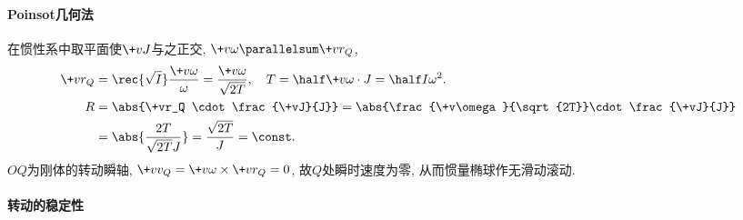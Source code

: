 \documentclass[../LectureNotes.tex]{subfiles}
\begin{document}
\paragraph{Poinsot几何法} %
\label{par:poinsot几何法}

在惯性系中取平面使$\+vJ$与之正交, $\+v\omega \parallelsum \+vr_Q$,
\begin{align*}
    \+vr_Q &= \rec{\sqrt{I}}\frac{\+v\omega}{\omega} = \frac{\+v\omega}{\sqrt{2T}},\quad T = \half \+v\omega\cdot J = \half I\omega^2. \\
    R &= \abs{\+vr_Q \cdot \frac{\+vJ}{J}} = \abs{\frac{\+v\omega}{\sqrt{2T}}\cdot\frac{\+vJ}{J}} \\
    &= \abs{\frac{2T}{\sqrt{2T}J}} = \frac{\sqrt{2T}}{J} = \const.
\end{align*}
$OQ$为刚体的转动瞬轴, $\+vv_Q = \+v\omega\times\+vr_Q = 0$, 故$Q$处瞬时速度为零, 从而惯量椭球作无滑动滚动.


\paragraph{转动的稳定性} %
\label{par:转动的稳定性}
\end{document}
